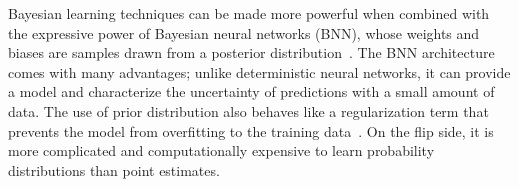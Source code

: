 



%
Bayesian learning techniques can be made more powerful when combined with the
expressive power of Bayesian neural networks (BNN), whose weights and biases are
samples drawn from a posterior distribution~\cite{jospin2020hands}. The BNN
architecture comes with many advantages; unlike deterministic neural networks,
it can provide a model and characterize the uncertainty of predictions with a
small amount of data. The use of prior distribution also behaves like a
regularization term that prevents the model from overfitting to the training
data~\cite{tipping2003bayesian}. On the flip side, it is more complicated and
computationally expensive to learn probability distributions than point
estimates.

